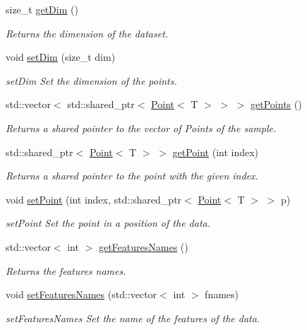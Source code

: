 \begin{DoxyCompactItemize}
size\+\_\+t \hyperlink{class_data_a87bdacb790f5a21966308c82b8be44d0}{get\+Dim} ()
\begin{DoxyCompactList}\small\item\em Returns the dimension of the dataset. \end{DoxyCompactList}\item 
void \hyperlink{class_data_ad6e602802e593e4700b3746de55f890b}{set\+Dim} (size\+\_\+t dim)
\begin{DoxyCompactList}\small\item\em set\+Dim Set the dimension of the points. \end{DoxyCompactList}\item 
std\+::vector$<$ std\+::shared\+\_\+ptr$<$ \hyperlink{class_point}{Point}$<$ T $>$ $>$ $>$ \hyperlink{class_data_a63a36fcbe42e0956d602f11af0d2009e}{get\+Points} ()
\begin{DoxyCompactList}\small\item\em Returns a shared pointer to the vector of Points of the sample. \end{DoxyCompactList}\item 
std\+::shared\+\_\+ptr$<$ \hyperlink{class_point}{Point}$<$ T $>$ $>$ \hyperlink{class_data_a482efc1083d4871758ddd05b11bb90ea}{get\+Point} (int index)
\begin{DoxyCompactList}\small\item\em Returns a shared pointer to the point with the given index. \end{DoxyCompactList}\item 
void \hyperlink{class_data_ade1a5caf2f463a894e1d348f728b56cf}{set\+Point} (int index, std\+::shared\+\_\+ptr$<$ \hyperlink{class_point}{Point}$<$ T $>$ $>$ p)
\begin{DoxyCompactList}\small\item\em set\+Point Set the point in a position of the data. \end{DoxyCompactList}\item 
std\+::vector$<$ int $>$ \hyperlink{class_data_a7ca6dfe5013024d75f3e13e42caa96f4}{get\+Features\+Names} ()
\begin{DoxyCompactList}\small\item\em Returns the features names. \end{DoxyCompactList}\item 
void \hyperlink{class_data_a3b22a1e56ab54ca6ecd84bef0ad968cc}{set\+Features\+Names} (std\+::vector$<$ int $>$ fnames)
\begin{DoxyCompactList}\small\item\em set\+Features\+Names Set the name of the features of the data. \end{DoxyCompactList}\item 

\end{DoxyCompactItemize}
